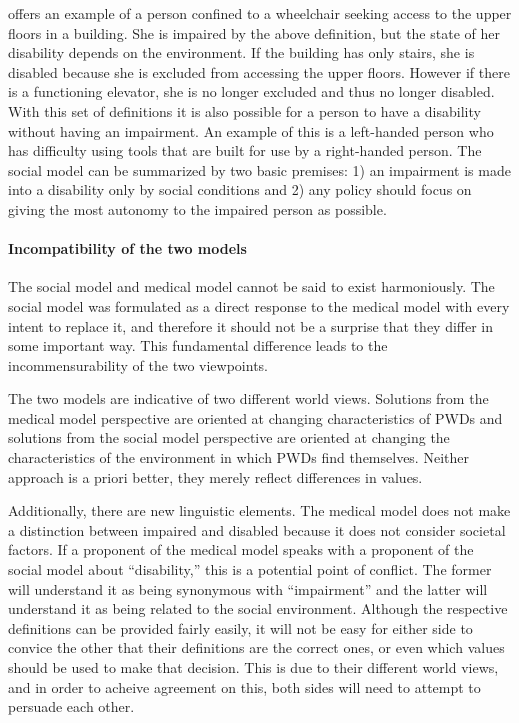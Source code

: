 \documentclass[a4paper]{article}
\begin{document}
\cite{winter2003development} offers an example of a person confined to a
wheelchair seeking access to the upper floors in a building. She is impaired
by the above definition, but the state of her disability depends on the
environment. If the building has only stairs, she is disabled because she is
excluded from accessing the upper floors. However if there is a functioning
elevator, she is no longer excluded and thus no longer disabled. With this set
of definitions it is also possible for a person to have a disability without
having an impairment. An example of this is a left-handed person who has
difficulty using tools that are built for use by a right-handed person. The
social model can be summarized by two basic premises: 1) an impairment is made
into a disability only by social conditions and 2) any policy should focus on
giving the most autonomy to the impaired person as possible.

\paragraph{Incompatibility of the two models}

The social model and medical model cannot be said to exist harmoniously. The
social model was formulated as a direct response to the medical model with
every intent to replace it, and therefore it should not be a surprise that
they differ in some important way. This fundamental difference leads to the
incommensurability of the two viewpoints. 

The two models are indicative of two different world views. Solutions from the
medical model perspective are oriented at changing characteristics of PWDs and
solutions from the social model perspective are oriented at changing the
characteristics of the environment in which PWDs find themselves. Neither
approach is a priori better, they merely reflect differences in values.

Additionally, there are new linguistic elements. The medical model does not
make a distinction between impaired and disabled because it does not consider
societal factors. If a proponent of the medical model speaks with a proponent
of the social model about ``disability,'' this is a potential point of
conflict. The former will understand it as being synonymous with
``impairment'' and the latter will understand it as being related to the
social environment. Although the respective definitions can be provided fairly
easily, it will not be easy for either side to convice the other that their
definitions are the correct ones, or even which values should be used to make
that decision. This is due to their different world views, and in order to
acheive agreement on this, both sides will need to attempt to persuade each
other.
\end{document}
